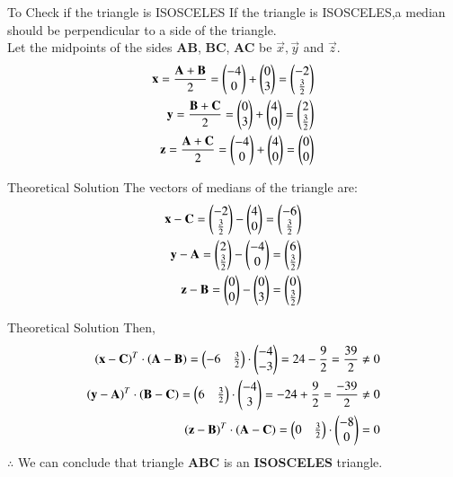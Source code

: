 \documentclass{beamer}
\begin{document}
\begin{frame}{To Check if the triangle is ISOSCELES}
If the triangle is ISOSCELES,a median should be perpendicular to a side of the triangle.\\
	Let the midpoints of the sides \textbf{AB}, \textbf{BC}, \textbf{AC} be $\vec{x}, \vec{y}$ and $\vec{z}$.
\begin{align}
\mathbf{x}=\frac{\mathbf{A}+\mathbf{B}}{2}=\begin{pmatrix}-4\\0\end{pmatrix}+\begin{pmatrix}0\\3\end{pmatrix}=\begin{pmatrix}-2\\\frac{3}{2}\end{pmatrix}\\ \mathbf{y}=\frac{\mathbf{B}+\mathbf{C}}{2}=\begin{pmatrix}0\\3\end{pmatrix}+\begin{pmatrix}4\\0\end{pmatrix}=\begin{pmatrix}2\\\frac{3}{2}\end{pmatrix}\\
\mathbf{z}=\frac{\mathbf{A}+\mathbf{C}}{2}=\begin{pmatrix}-4\\0\end{pmatrix}+\begin{pmatrix}4\\0\end{pmatrix}=\begin{pmatrix}0\\0\end{pmatrix} 
\end{align}
\end{frame}

\begin{frame}{Theoretical Solution}
The vectors of medians of the triangle are:
\begin{align}
    \mathbf{x}-\mathbf{C}=\begin{pmatrix}-2\\\frac{3}{2}\end{pmatrix}-\begin{pmatrix}4\\0\end{pmatrix}=\begin{pmatrix}-6\\\frac{3}{2}\end{pmatrix}\\
    \mathbf{y}-\mathbf{A}=\begin{pmatrix}2\\\frac{3}{2}\end{pmatrix}-\begin{pmatrix}-4\\0\end{pmatrix}=\begin{pmatrix}6\\\frac{3}{2}\end{pmatrix}\\
    \mathbf{z}-\mathbf{B}=\begin{pmatrix}0\\0\end{pmatrix}-\begin{pmatrix}0\\3\end{pmatrix}=\begin{pmatrix}0\\\frac{3}{2}\end{pmatrix}
\end{align}
\end{frame}

\begin{frame}{Theoretical Solution}
Then,
\begin{align}
  \left(\mathbf{x}-\mathbf{C}\right)^T \cdot \left(\mathbf{A}-\mathbf{B}\right)=\begin{pmatrix}-6&\frac{3}{2}\end{pmatrix} \cdot \begin{pmatrix}-4\\-3\end{pmatrix}=24-\frac{9}{2}=\frac{39}{2} \neq 0\\
     \left( \mathbf{y}-\mathbf{A}\right)^T \cdot \left(\mathbf{B}-\mathbf{C}\right)= \begin{pmatrix}6&\frac{3}{2}\end{pmatrix} \cdot \begin{pmatrix}-4\\3\end{pmatrix}=-24+\frac{9}{2}=\frac{-39}{2} \neq 0\\
     \left( \mathbf{z}-\mathbf{B}\right)^T \cdot \left(\mathbf{A}-\mathbf{C}\right)= \begin{pmatrix}0&\frac{3}{2}\end{pmatrix} \cdot \begin{pmatrix}-8\\0\end{pmatrix}=0
\end{align}
$ \therefore$ We can conclude that triangle \textbf{ABC} is an \textbf{ISOSCELES} triangle.
\end{frame}
\end{document}
